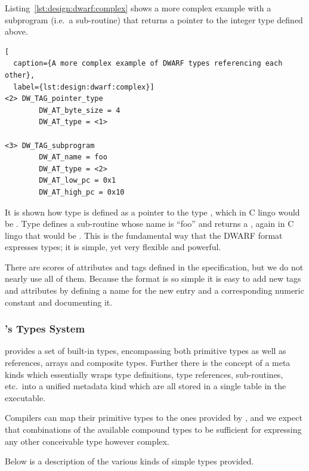 Listing~\ref{lst:design:dwarf:complex} shows a more complex example with a
subprogram (i.e.~a sub-routine) that returns a pointer to the integer type
defined above.

\begin{lstlisting}[
  caption={A more complex example of DWARF types referencing each other},
  label={lst:design:dwarf:complex}]
<2> DW_TAG_pointer_type
        DW_AT_byte_size = 4
        DW_AT_type = <1>

<3> DW_TAG_subprogram
        DW_AT_name = foo
        DW_AT_type = <2>
        DW_AT_low_pc = 0x1
        DW_AT_high_pc = 0x10
\end{lstlisting}

It is shown how type  is defined as a pointer to the type ,
which in C lingo would be . Type  defines a sub-routine
whose name is ``foo'' and returns a , again in C lingo that would be
. This is the fundamental way that the DWARF format
expresses types; it is simple, yet very flexible and powerful.

There are scores of attributes and tags defined in the specification, but we do
not nearly use all of them. Because the format is so simple it is easy to add
new tags and attributes by defining a name for the new entry and a corresponding
numeric constant and documenting it.

\subsubsection{\thename{}'s Types System}
\label{sec:design:type-system}

\thename{} provides a set of built-in types, encompassing both primitive types
as well as references, arrays and composite types. Further there is the concept
of a meta kinds which essentially wraps type definitions, type references,
sub-routines, etc.~into a unified metadata kind which are all stored in a single
table in the executable.

Compilers can map their primitive types to the ones provided by \thename{}, and
we expect that combinations of the available compound types to be sufficient for
expressing any other conceivable type however complex.

Below is a description of the various kinds of simple types provided.

